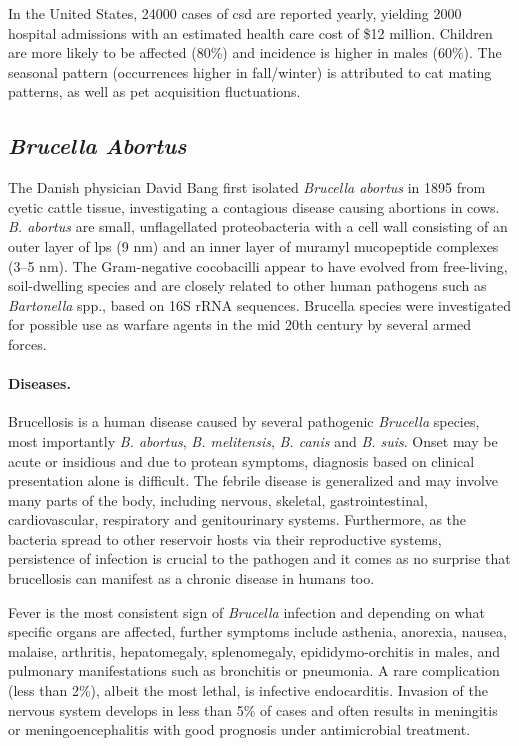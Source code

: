 In the United States, 24000 cases of \gls{csd} are reported yearly, yielding 2000 hospital admissions with an estimated health care cost of \$12 million. Children are more likely to be affected (80\%) and incidence is higher in males (60\%). The seasonal pattern (occurrences higher in fall\slash winter) is attributed to cat mating patterns, as well as pet acquisition fluctuations.

\subsection{\textit{Brucella Abortus}}

The Danish physician David Bang first isolated \textit{Brucella abortus} in 1895 from cyetic cattle tissue, investigating a contagious disease causing abortions in cows. \textit{B. abortus} are small, unflagellated proteobacteria with a cell wall consisting of an outer layer of \gls{lps} (9 nm) and an inner layer of muramyl mucopeptide complexes (3--5 nm). The Gram-negative cocobacilli appear to have evolved from free-living, soil-dwelling species and are closely related to other human pathogens such as \textit{Bartonella} spp., based on 16S rRNA sequences. Brucella species were investigated for possible use as warfare agents in the mid 20th century by several armed forces. \citep{Atluri2011,VonBargen2012}

\paragraph{Diseases.}
Brucellosis is a human disease caused by several pathogenic \textit{Brucella} species, most importantly \textit{B. abortus}, \textit{B. melitensis}, \textit{B. canis} and \textit{B. suis}. Onset may be acute or insidious and due to protean symptoms, diagnosis based on clinical presentation alone is difficult. The febrile disease is generalized and may involve many parts of the body, including nervous, skeletal, gastrointestinal, cardiovascular, respiratory and genitourinary systems. Furthermore, as the bacteria spread to other reservoir hosts via their reproductive systems, persistence of infection is crucial to the pathogen and it comes as no surprise that brucellosis can manifest as a chronic disease in humans too.

Fever is the most consistent sign of \textit{Brucella} infection and depending on what specific organs are affected, further symptoms include asthenia, anorexia, nausea, malaise, arthritis, hepatomegaly, splenomegaly, epididymo-orchitis in males, and pulmonary manifestations such as bronchitis or pneumonia. A rare complication (less than 2\%), albeit the most lethal, is infective endocarditis. Invasion of the nervous system develops in less than 5\% of cases and often results in meningitis or meningoencephalitis with good prognosis under antimicrobial treatment.

